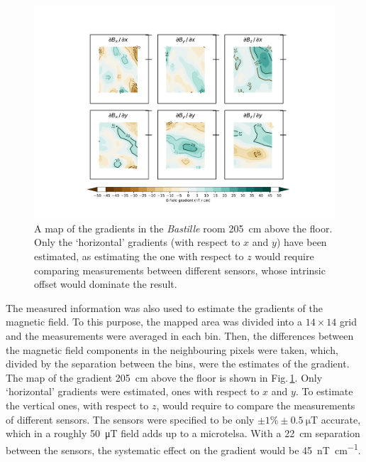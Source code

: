 \begin{figure}
  \centering
  \includegraphics[width=\linewidth]{gfx/mapping/lpsc/bastille_crane_away_rep_gradient_205cm_crop.pdf}
  \caption{A map of the gradients in the \emph{Bastille} room \SI{205}{\centi\metre} above the floor. Only the `horizontal' gradients (with respect to $x$ and $y$) have been estimated, as estimating the one with respect to $z$ would require comparing measurements between different sensors, whose intrinsic offset would dominate the result.}\label{fig:mapping_bastille_gradient}
\end{figure}

The measured information was also used to estimate the gradients of the magnetic field. To this purpose, the mapped area was divided into a $14 \times 14$ grid and the measurements were averaged in each bin.
Then, the differences between the magnetic field components in the neighbouring pixels were taken, which, divided by the separation between the bins, were the estimates of the gradient.
The map of the gradient \SI{205}{\centi\metre} above the floor is shown in Fig.\,\ref{fig:mapping_bastille_gradient}.
Only `horizontal' gradients were estimated, ones with respect to $x$ and $y$.
To estimate the vertical ones, with respect to $z$, would require to compare the measurements of different sensors. The sensors were specified to be only $\pm 1\% \pm \SI{0.5}{\micro\tesla}$ accurate, which in a roughly \SI{50}{\micro\tesla} field adds up to a microtelsa. With a \SI{22}{\centi\meter} separation between the sensors, the systematic effect on the gradient would be \SI[per-mode=symbol]{45}{\nano\tesla\per\centi\meter}.


